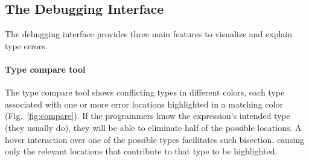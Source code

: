 


\subsection{The Debugging Interface}

The \chameleon{} debugging interface provides three main features to visualize and explain type errors.



\paragraph{Type compare tool} \label{sub:type-compare}

The type compare tool shows conflicting types in different colors, each type associated with one or more error locations highlighted in a matching color (Fig.~\ref{fig:compare}).  
If the programmers know the expression's intended type (they usually do), they will be able to eliminate half of the possible locations. 
A hover interaction over one of the possible types facilitates such bisection, causing only the relevant locations that contribute to that type to be highlighted. 


